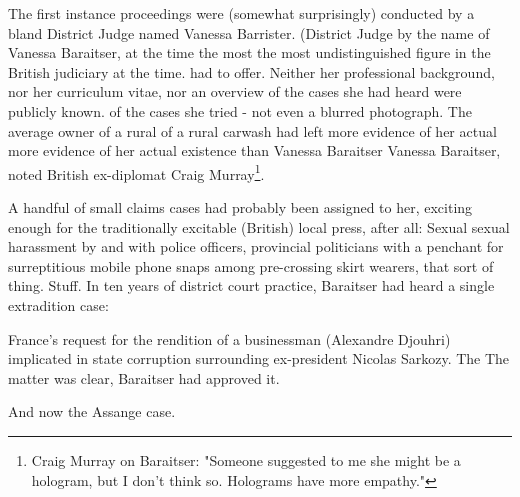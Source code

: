 \begin{multicols}{2}
The first instance proceedings were (somewhat surprisingly) conducted by a bland District Judge named Vanessa Barrister.
(District Judge by the name of Vanessa Baraitser, at the time the most
the most undistinguished figure in the British judiciary at the time.
had to offer. Neither her professional background, nor her curriculum vitae, nor an overview of the cases she had heard were publicly known.
of the cases she tried - not even a blurred photograph. The average owner of a rural
of a rural carwash had left more evidence of her actual
more evidence of her actual existence than Vanessa Baraitser
Vanessa Baraitser, noted British ex-diplomat
Craig Murray\footnote[1]{Craig Murray on Baraitser: "Someone suggested to me she might be a hologram, but I don't think so. Holograms have more empathy."}.

A handful of small claims cases had probably been assigned to her, exciting enough for the traditionally excitable (British) local press, after all: Sexual
sexual harassment by and with police officers, provincial politicians
with a penchant for surreptitious mobile phone snaps among pre-crossing skirt wearers, that sort of thing.
Stuff. In ten years of district court practice, Baraitser had heard a single extradition case:

France's request for the rendition of a businessman (Alexandre Djouhri) implicated in state corruption surrounding ex-president Nicolas Sarkozy. The
The matter was clear, Baraitser had approved it.

And now the Assange case.




\end{multicols}
